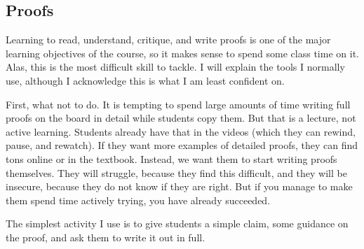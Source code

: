 \documentclass[11pt]{article}
\begin{document}
	\newpage

	\subsection{Proofs}

	Learning to read, understand, critique, and write proofs is one of the major learning
	objectives of the course, so it makes sense to spend some class time on it. Alas,
	this is the most difficult skill to tackle. I will explain the tools I normally
	use, although I acknowledge this is what I am least confident on.

	{\baselineskip First, what not to do. It is tempting to spend large amounts of time writing full proofs on the board in detail while students copy them. But that is a lecture, not active learning. Students already have that in the videos (which they can rewind, pause, and rewatch). If they want more examples of detailed proofs, they can find tons online or in the textbook. Instead, we want them to start writing proofs themselves. They will struggle, because they find this difficult, and they will be insecure, because they do not know if they are right. But if you manage to make them spend time actively trying, you have already succeeded.

	The simplest activity I use is to give students a simple claim, some guidance on the proof, and ask them to write it out in full.\\ }
\end{document}
